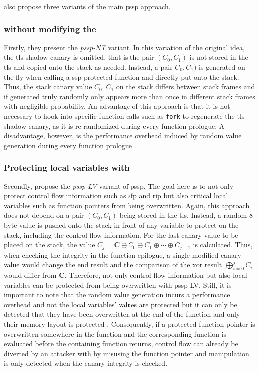  also propose three variants of the main \gls{pssp} approach.

\subsubsection{ without modifying the }
\label{subsubsec:p-ssp-nt}

Firstly, they present the \emph{\acs{pssp}-NT} variant.
In this variation of the original idea, the \acs{tls} shadow canary is omitted, that is the pair $ (C_0, C_1) $ is not stored in the \gls{tls} and copied onto the stack as needed.
Instead, a pair $ C_0, C_1) $ is generated on the fly when calling a \acs{ssp}-protected function and directly put onto the stack.
Thus, the stack canary value $ C_0 || C_1 $ on the stack differs between stack frames and if generated truly randomly only appears more than once in different stack frames with negligible probability.
An advantage of this approach is that it is not necessary to hook into specific function calls such as \texttt{fork} to regenerate the \acs{tls} shadow canary, as it is re-randomized during every function prologue.
A disadvantage, however, is the performance overhead induced by random value generation during every function prologue \cite[247]{Wang2018}.

\subsubsection{Protecting local variables with }
\label{subsubsec:p-ssp-lv}

Secondly, \citeauthor{Wang2018} propose the \emph{\acs{pssp}-LV} variant of \gls{pssp}.
The goal here is to not only protect control flow information such as \gls{sfp} and \gls{rip} but also critical local variables such as function pointers from being overwritten.
Again, this approach does not depend on a pair $ (C_0, C_1) $ being stored in the \gls{tls}.
Instead, a random 8 byte value is pushed onto the stack in front of any variable to protect on the stack, including the control flow information.
For the last canary value to be placed on the stack, the value $ C_j = \textbf{C} \oplus C_0 \oplus C_1 \oplus \cdots \oplus C_{j - 1} $ is calculated.
Thus, when checking the integrity in the function epilogue, a single modified canary value would change the end result and the comparison of the \acs{xor} result $ \bigoplus_{i = 0}^{j}{C_i} $ would differ from \textbf{C}.
Therefore, not only control flow information but also local variables can be protected from being overwritten with \acs{pssp}-LV.
Still, it is important to note that the random value generation incurs a performance overhead and not the local variables' values are protected but it can only be detected that they have been overwritten at the end of the function and only their memory layout is protected \cite[247]{Wang2018}.
Consequently, if a protected function pointer is overwritten somewhere in the function and the corresponding function is evaluated before the containing function returns, control flow can already be diverted by an attacker with by misusing the function pointer and manipulation is only detected when the canary integrity is checked.

